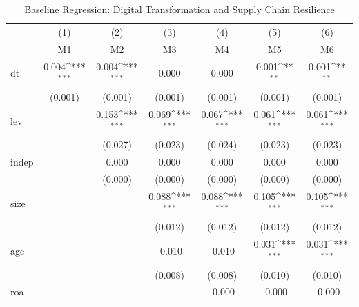 \begin{table}[htbp]\centering
\def\sym#1{\ifmmode^{#1}\else\(^{#1}\)\fi}
\caption{Baseline Regression: Digital Transformation and Supply Chain Resilience}
\begin{tabular}{l*{6}{c}}
\hline\hline
            &\multicolumn{1}{c}{(1)}&\multicolumn{1}{c}{(2)}&\multicolumn{1}{c}{(3)}&\multicolumn{1}{c}{(4)}&\multicolumn{1}{c}{(5)}&\multicolumn{1}{c}{(6)}\\
            &\multicolumn{1}{c}{M1}&\multicolumn{1}{c}{M2}&\multicolumn{1}{c}{M3}&\multicolumn{1}{c}{M4}&\multicolumn{1}{c}{M5}&\multicolumn{1}{c}{M6}\\
\hline
dt          &       0.004\sym{***}&       0.004\sym{***}&       0.000         &       0.000         &       0.001\sym{**} &       0.001\sym{**} \\
            &     (0.001)         &     (0.001)         &     (0.001)         &     (0.001)         &     (0.001)         &     (0.001)         \\
[1em]
lev         &                     &       0.153\sym{***}&       0.069\sym{***}&       0.067\sym{***}&       0.061\sym{***}&       0.061\sym{***}\\
            &                     &     (0.027)         &     (0.023)         &     (0.024)         &     (0.023)         &     (0.023)         \\
[1em]
indep       &                     &       0.000         &       0.000         &       0.000         &       0.000         &       0.000         \\
            &                     &     (0.000)         &     (0.000)         &     (0.000)         &     (0.000)         &     (0.000)         \\
[1em]
size        &                     &                     &       0.088\sym{***}&       0.088\sym{***}&       0.105\sym{***}&       0.105\sym{***}\\
            &                     &                     &     (0.012)         &     (0.012)         &     (0.012)         &     (0.012)         \\
[1em]
age         &                     &                     &      -0.010         &      -0.010         &       0.031\sym{***}&       0.031\sym{***}\\
            &                     &                     &     (0.008)         &     (0.008)         &     (0.010)         &     (0.010)         \\
[1em]
roa         &                     &                     &                     &      -0.000         &      -0.000         &      -0.000         \\

\end{tabular}
\end{table}

